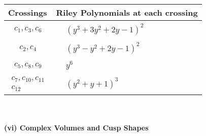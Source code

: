 \documentclass[1p]{elsarticle_modified}
\theoremstyle{definition}
\begin{document}
\begin{tabular}{m{50pt}|m{274pt}}
Crossings & \hspace{64pt}Riley Polynomials at each crossing \\
\hline $$\begin{aligned}c_{1},c_{3},c_{6}\end{aligned}$$&$\begin{aligned}
&(y^3+3 y^2+2 y-1)^2
\end{aligned}$\\
\hline $$\begin{aligned}c_{2},c_{4}\end{aligned}$$&$\begin{aligned}
&(y^3- y^2+2 y-1)^2
\end{aligned}$\\
\hline $$\begin{aligned}c_{5},c_{8},c_{9}\end{aligned}$$&$\begin{aligned}
&y^6
\end{aligned}$\\
\hline $$\begin{aligned}c_{7},c_{10},c_{11}\\c_{12}\end{aligned}$$&$\begin{aligned}
&(y^2+y+1)^3
\end{aligned}$\\
\hline
\end{tabular}\\~\\
\newpage\flushleft \textbf{(vi) Complex Volumes and Cusp Shapes}
\end{document}
